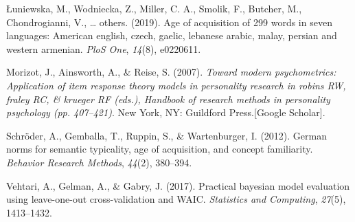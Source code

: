 \documentclass[
  man,floatsintext]{apa6}
\newlength{\cslhangindent}
\newlength{\cslentryspacingunit} %
\newenvironment{CSLReferences}[2] %
 {%
  \setlength{\parindent}{0pt}
  \ifodd #1
  \let\oldpar\par
  \def\par{\hangindent=\cslhangindent\oldpar}
  \fi
  \setlength{\parskip}{#2\cslentryspacingunit}
 }%
 {}
\begin{document}
\begin{CSLReferences}{1}{0}
\leavevmode{}%
Łuniewska, M., Wodniecka, Z., Miller, C. A., Smolik, F., Butcher, M., Chondrogianni, V., \ldots{} others. (2019). Age of acquisition of 299 words in seven languages: American english, czech, gaelic, lebanese arabic, malay, persian and western armenian. \emph{PloS One}, \emph{14}(8), e0220611.

\leavevmode{}%
Morizot, J., Ainsworth, A., \& Reise, S. (2007). \emph{Toward modern psychometrics: Application of item response theory models in personality research in robins RW, fraley RC, \& krueger RF (eds.), Handbook of research methods in personality psychology (pp. 407--421)}. New York, NY: Guildford Press.{[}Google Scholar{]}.

\leavevmode{}%
Schröder, A., Gemballa, T., Ruppin, S., \& Wartenburger, I. (2012). German norms for semantic typicality, age of acquisition, and concept familiarity. \emph{Behavior Research Methods}, \emph{44}(2), 380--394.

\leavevmode{}%
Vehtari, A., Gelman, A., \& Gabry, J. (2017). Practical bayesian model evaluation using leave-one-out cross-validation and WAIC. \emph{Statistics and Computing}, \emph{27}(5), 1413--1432.

\end{CSLReferences}
\end{document}
